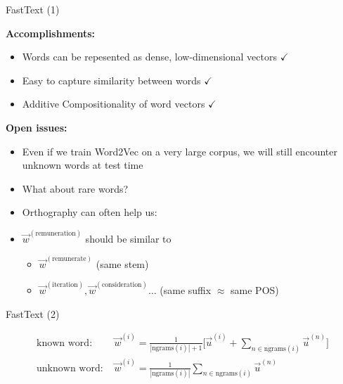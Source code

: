 \begin{vbframe}{FastText (1)}

\vfill

\textbf{Accomplishments:}

\begin{itemize}
	\item Words can be repesented as dense, low-dimensional vectors \hfill $\checkmark$
	\item Easy to capture similarity between words \hfill $\checkmark$
	\item Additive Compositionality of word vectors \hfill $\checkmark$
\end{itemize}

\textbf{Open issues:}

\begin{itemize}
	\item Even if we train Word2Vec on a very large corpus, we will still encounter unknown words at test time
	\item What about rare words? 
	\item Orthography can often help us:
	\item $\vec w^{(\text{remuneration})}$ should be similar to
		\begin{itemize}
			\item $\vec w^{(\text{remunerate})}$ (same stem)
			\item $\vec w^{(\text{iteration})}, \vec w^{(\text{consideration})} \ldots$ (same suffix $\approx$ same POS)
		\end{itemize}
\end{itemize}

\vfill

\end{vbframe}


\begin{vbframe}{FastText (2)}

\vfill

\begin{align}
\displaystyle
\text{known word:  } & \vec w^{(i)} = \frac{1}{|\mathrm{ngrams}(i)| + 1} \Big[ \vec u^{(i)} + \sum_{n \in \mathrm{ngrams}(i)} \vec u^{(n)} \Big] \nonumber \\
\text{unknown word:  } & \vec w^{(i)} = \frac{1}{|\mathrm{ngrams}(i)|} \sum_{n \in \mathrm{ngrams}(i)} \vec u^{(n)} \nonumber
\end{align}


\vfill

\end{vbframe}

